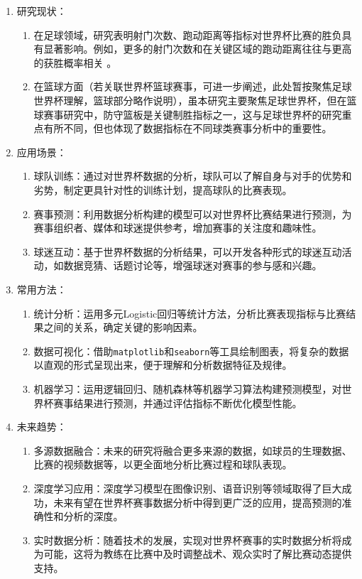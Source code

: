 \documentclass{beamer}
\begin{document}
			
			\begin{frame}
				\begin{enumerate}[label=\arabic*.]
					\item 研究现状：
					\begin{enumerate}[label=\arabic{*}.]
						\item 在足球领域，研究表明射门次数、跑动距离等指标对世界杯比赛的胜负具有显著影响。例如，更多的射门次数和在关键区域的跑动距离往往与更高的获胜概率相关 。
						\item 在篮球方面（若关联世界杯篮球赛事，可进一步阐述，此处暂按聚焦足球世界杯理解，篮球部分略作说明），虽本研究主要聚焦足球世界杯，但在篮球赛事研究中，防守篮板是关键制胜指标之一，这与足球世界杯的研究重点有所不同，但也体现了数据指标在不同球类赛事分析中的重要性。
					\end{enumerate}
					\item 应用场景：
					\begin{enumerate}[label=\arabic{*}.]
						\item 球队训练：通过对世界杯数据的分析，球队可以了解自身与对手的优势和劣势，制定更具针对性的训练计划，提高球队的比赛表现。
						\item 赛事预测：利用数据分析构建的模型可以对世界杯比赛结果进行预测，为赛事组织者、媒体和球迷提供参考，增加赛事的关注度和趣味性。
						\item 球迷互动：基于世界杯数据的分析结果，可以开发各种形式的球迷互动活动，如数据竞猜、话题讨论等，增强球迷对赛事的参与感和兴趣。
					\end{enumerate}
					\item 常用方法：
					\begin{enumerate}[label=\arabic{*}.]
						\item 统计分析：运用多元Logistic回归等统计方法，分析比赛表现指标与比赛结果之间的关系，确定关键的影响因素。
						\item 数据可视化：借助\texttt{matplotlib}和\texttt{seaborn}等工具绘制图表，将复杂的数据以直观的形式呈现出来，便于理解和分析数据特征及规律。
						\item 机器学习：运用逻辑回归、随机森林等机器学习算法构建预测模型，对世界杯赛事结果进行预测，并通过评估指标不断优化模型性能。
					\end{enumerate}
					\item 未来趋势：
					\begin{enumerate}[label=\arabic{*}.]
						\item 多源数据融合：未来的研究将融合更多来源的数据，如球员的生理数据、比赛的视频数据等，以更全面地分析比赛过程和球队表现。
						\item 深度学习应用：深度学习模型在图像识别、语音识别等领域取得了巨大成功，未来有望在世界杯赛事数据分析中得到更广泛的应用，提高预测的准确性和分析的深度。
						\item 实时数据分析：随着技术的发展，实现对世界杯赛事的实时数据分析将成为可能，这将为教练在比赛中及时调整战术、观众实时了解比赛动态提供支持。
					\end{enumerate}
				\end{enumerate}
			\end{frame}
			
\end{document}
